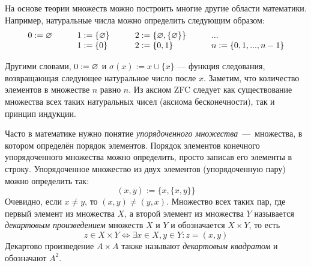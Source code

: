 На основе теории множеств можно построить многие другие области математики.
Например, натуральные числа можно определить следующим образом:
\[ \begin{array}{llll}
	0 :=\varnothing\qquad & 1  :=\{\varnothing\}\qquad & 2  :=\{\varnothing,\{\varnothing\}\}\qquad & ... \\
	& 1:=\{0\}\qquad       & 2:=\{0,1\}
	& n:=\{0,1,...,n-1\}
\end{array}
\]

Другими словами, ${0:=\varnothing}$ и $\sigma(x):=x\cup \{x\}$ --- функция следования,
возвращающая следующее натуральное число после $x$. Заметим, что количество элементов
в множестве $n$ равно $n$. Из аксиом ZFC следует как существование множества
всех таких натуральных чисел (аксиома бесконечности), так и принцип индукции.

Часто в математике нужно понятие {\it упорядоченного множества}~---~множества,
в котором определён порядок элементов. Порядок элементов
конечного упорядоченного множества можно
определить, просто записав его элементы в строку.
Упорядоченное множество из двух элементов (упорядоченную пару)
можно определить так:
\[
	(x,y):=\{x,\{x,y\}\}
\]
Очевидно, если $x\neq y$, то $(x,y)\neq(y,x)$. Множество
всех таких пар, где первый элемент из множества $X$, а второй элемент
из множества $Y$ называется {\it декартовым произведением} множеств
$X$ и $Y$ и
обозначается $X\times Y$, то есть
\[
	z\in X\times Y\iff \exists x\in X,y\in Y:z=(x,y)
\]
Декартово произведение $A\times A$ также называют {\it декартовым квадратом}
и обозначают $A^{2}$.


%
%
\pagebreak

